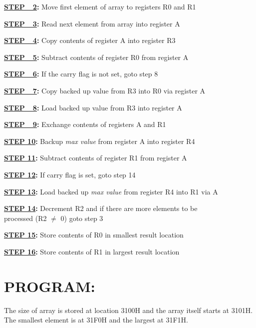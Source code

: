 \documentclass[a4paper,28pt,twoside,openright]{report}
\begin{document}
\textbf{\underline{STEP\ \ 2}:} Move first element of array to registers R0 and R1

\textbf{\underline{STEP\ \ 3}:} Read next element from array into register A

\textbf{\underline{STEP\ \ 4}:} Copy contents of register A into register R3

\textbf{\underline{STEP\ \ 5}:} Subtract contents of register R0 from register A

\textbf{\underline{STEP\ \ 6}:} If the carry flag is not set, goto step 8

\textbf{\underline{STEP\ \ 7}:} Copy backed up value from R3 into R0 via register A

\textbf{\underline{STEP\ \ 8}:} Load backed up value from R3 into register A

\textbf{\underline{STEP\ \ 9}:} Exchange contents of registers A and R1

\textbf{\underline{STEP 10}:} Backup \emph{max value} from register A into register R4

\textbf{\underline{STEP 11}:} Subtract contents of register R1 from register A

\textbf{\underline{STEP 12}:} If carry flag is set, goto step 14

\textbf{\underline{STEP 13}:} Load backed up \emph{max value} from register R4 into R1 via A

\textbf{\underline{STEP 14}:} Decrement R2 and if there are more elements to be \\\hspace*{62pt}processed (R2 $\neq$ 0) goto step 3

\textbf{\underline{STEP 15}:} Store contents of R0 in smallest result location

\textbf{\underline{STEP 16}:} Store contents of R1 in largest result location

\section*{PROGRAM:}
The size of array is stored at location 3100H and the array itself starts at 3101H. The smallest element is at 31F0H and the largest at 31F1H.
\end{document}
